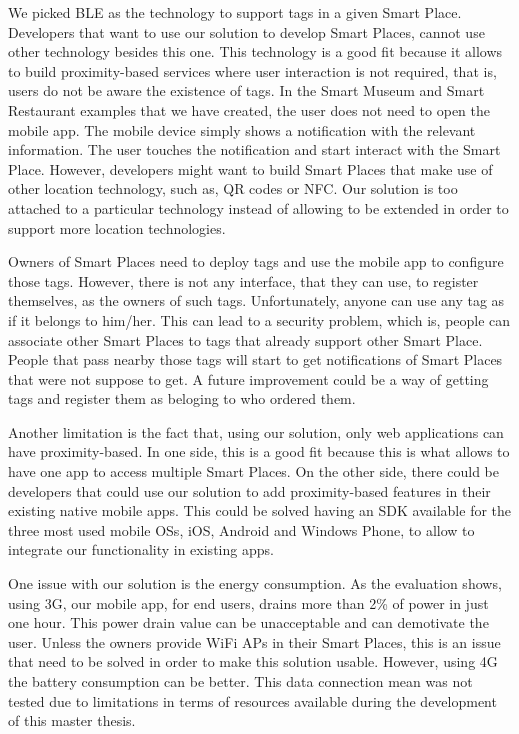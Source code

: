 We picked \gls{BLE} as the technology to support tags in a given Smart Place.
Developers that want to use our solution to develop Smart Places, cannot use other technology besides this one.
This technology is a good fit because it allows to build proximity-based services where user interaction is not required, that is, users do not be aware the existence of tags.
In the Smart Museum and Smart Restaurant examples that we have created, the user does not need to open the mobile app.
The mobile device simply shows a notification with the relevant information. The user touches the notification and start interact with the Smart Place.
However, developers might want to build Smart Places that make use of other location technology, such as, \gls{QR} codes or \gls{NFC}.
Our solution is too attached to a particular technology instead of allowing to be extended in order to support more location technologies.

Owners of Smart Places need to deploy tags and use the mobile app to configure those tags.
However, there is not any interface, that they can use, to register themselves, as the owners of such tags.
Unfortunately, anyone can use any tag as if it belongs to him/her.
This can lead to a security problem, which is, people can associate other Smart Places to tags that already support other Smart Place.
People that pass nearby those tags will start to get notifications of Smart Places that were not suppose to get.
A future improvement could be a way of getting tags and register them as beloging to who ordered them.

Another limitation is the fact that, using our solution, only web applications can have proximity-based.
In one side, this is a good fit because this is what allows to have one app to access multiple Smart Places.
On the other side, there could be developers that could use our solution to add proximity-based features in their existing native mobile apps.
This could be solved having an \gls{SDK} available for the three most used mobile \glspl{OS}, iOS, Android and Windows Phone, to allow to integrate our functionality in existing apps.

One issue with our solution is the energy consumption.
As the evaluation shows, using \gls{3G}, our mobile app, for end users, drains more than 2\% of power in just one hour. This power drain value can be unacceptable and can demotivate the user.
Unless the owners provide \gls{WiFi} \glspl{AP} in their Smart Places, this is an issue that need to be solved in order to make this solution usable.
However, using \gls{4G} the battery consumption can be better.
This data connection mean was not tested due to limitations in terms of resources available during the development of this master thesis.

